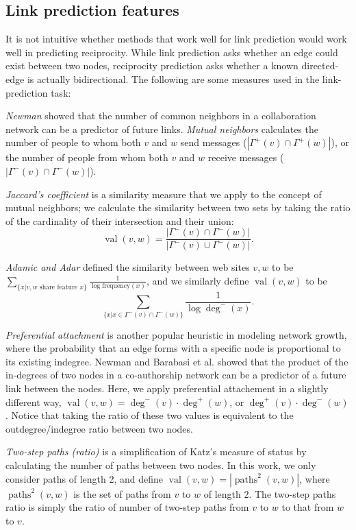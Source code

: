 \documentclass[conference]{IEEEtran}
\begin{document}
\subsection{Link prediction features}

It is not intuitive whether methods that work well for link prediction would work well in predicting reciprocity. 
While link prediction asks whether an edge could exist between two nodes, reciprocity prediction asks whether a known directed-edge is actually bidirectional.
The following are some measures used in the link-prediction task:

\emph{Newman} \cite{graph:common-neighbors} showed that the number of common neighbors in a collaboration network can be a predictor of future links. \emph{Mutual neighbors} calculates the number of people to whom both $v$ and $w$ send messages ($|\Gamma^+(v) \cap \Gamma^+(w)|$), or the number of people from whom both $v$ and $w$ receive messages ($|\Gamma^-(v) \cap \Gamma^-(w)|$).

\emph{Jaccard's coefficient} \cite{Salton:86} is a similarity measure
that we apply to the concept of mutual neighbors; we calculate the
similarity between two sets by taking the ratio of the cardinality of
their intersection and their union: \[\operatorname{val}(v,w) =
\frac{|\Gamma^-(v) \cap \Gamma^-(w)|}{|\Gamma^-(v) \cup
\Gamma^-(w)|}.\]

\emph{Adamic and Adar} \cite{Adamic:2003ud} defined the similarity between web sites $v,w$ to be $ \sum_{\{x|v,w \text{ share feature }x\}} \frac{1}{\log{\text{frequency}(x)}} $, and we similarly define $\operatorname{val}(v,w)$ to be \[ \sum_{\{x|x \in \Gamma^-(v) \cap \Gamma^-(w)\}} \frac{1}{\log{\deg^-(x)}} .\]

\emph{Preferential attachment} is another popular heuristic in modeling network growth, where the probability that an edge forms with a specific node is proportional to its existing indegree. Newman \cite{graph:common-neighbors} and Barabasi et al. \cite{Barabasi:2002} showed that the product of the in-degrees of two nodes in a co-authorship network can be a predictor of a future link between the nodes. Here, we apply preferential attachement in a slightly different way,  $\operatorname{val}(v,w) = \deg^-(v)\cdot \deg^+(w)$, or $\deg^+(v)\cdot \deg^-(w)$. 
Notice that taking the ratio of these two values is equivalent to the outdegree/indegree ratio between two nodes.

\emph{Two-step paths (ratio)} is a simplification of Katz's \cite{Katz:1953un} measure of status by calculating the number of paths between two nodes. 
In this work, we only consider paths of length 2, and define $\operatorname{val}(v,w) = |\operatorname{paths}^2(v,w)|$, where $\operatorname{paths}^2(v,w)$ is the set of paths from $v$ to $w$ of length $2$. 
The two-step paths ratio is simply the ratio of number of two-step paths from $v$ to $w$ to that from $w$ to $v$. 
\end{document}
